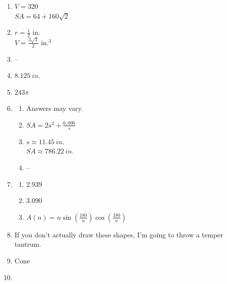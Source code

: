 \documentclass{article}
\begin{document}
\begin{enumerate}
\begin{enumerate}
	\end{enumerate}
	
\item $V = 320$ \\
	$SA = 64 + 160 \sqrt{2}$
	
\item $r = \frac{1}{2}$ in. \\
	$V = \frac{3\sqrt{3}}{2}$ in.$^3$
	
\item --

\item $8.125 \ in.$

\item $243 \pi$

\item

	\begin{enumerate}
	
	\item Answers may vary.
	
	\item $SA = 2s^2 + \frac{6,000}{s}$
	
	\item $s \approx 11.45 \ in.$ \\
		$SA \approx 786.22 \ in.$
	
	\item --
	
	\end{enumerate}
	
\item

	\begin{enumerate}
	
	\item 2.939
	
	\item 3.090
	
	\item $A(n) = n \sin{\left( \frac{180}{n} \right)} \cos{\left( \frac{180}{n} \right)}$
	
	\end{enumerate}
	
\item If you don't actually draw these shapes, I'm going to throw a temper tantrum.

\item Cone

\item

	\begin{enumerate}
	

\end{enumerate}
\end{enumerate}
\end{document}
